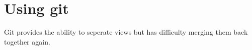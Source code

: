 
\chapter{Using git}
Git provides the ability to seperate views but has difficulty merging them back together again.  


% 

